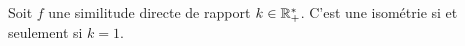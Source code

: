 \begin{remarque}
Soit $f$ une similitude directe de rapport $k\in\mathbb{R}_+^*$. C'est une isométrie si et seulement si $k=1$.
\end{remarque}

\begin{comment}
\begin{attention}
La terminologie \emph{rapport} désigne deux choses différentes selon si on parle d'une homothétie ou bien d'une similitude. C'est un peu malheureux mais c'est comme ça.
\begin{enumerate}
\item Le rapport d'une homothétie est un réel non nul. Par exemple, une homothétie peut avoir rapport $-1$.
\item Le rapport d'une similitude est un réel strictement positif. Une similitude ne peut pas avoir un rapport $-1$.
\end{enumerate}
Le problème est qu'une homothétie est un cas particulier de similitude. Considérons par exemple une symétrie centrale $f$, autrement dit une rotation d'angle $\pi$, ou encore, une \textbf{homothétie de rapport $-1$}. L'application $f$ est également une similitude, et \textbf{en tant que similitude}, son rapport est... $1$ (et pas $-1$).

Avec l'habitude, ceci ne pose pas de problème mais si on n'est pas assez familier des différentes notions, on peut confondre les contextes et faire des fautes. Conclusion : faites des exercices d'entraînement !
\end{attention}

\begin{remarques}
Considérons une similitude directe $f$. D'après ce qui précède, on peut attacher à $f$ deux paramètres uniques $a\in\C^*$ et $b\in\C$ qui sont ceux de la définition de similitude directe. La situation est alors résumée par le tableau suivant:\\

\begin{tabular}{|l|c|c|c|}\hline
			& $a=1$	& $|a|=1$ et $a\neq 1$	& $|a|\neq 1$	\\ \hline
$b=0$		& Identité (translation et rotation) & rotation non triviale &  \\ \hline
$b\neq 0$	& translation non triviale & rotation non triviale & \\ \hline 
\end{tabular}
\end{remarques}

\end{comment}


